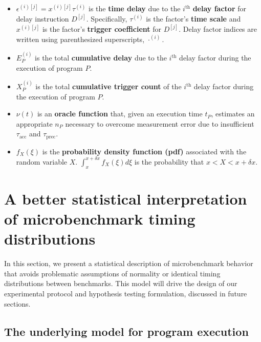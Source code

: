 \documentclass[conference]{IEEEtran}
\begin{document}
\begin{itemize}
    \item
    $\epsilon^{(i)[j]} = x^{(i)[j]} \tau^{(i)}$ is the \textbf{time delay} due to the
    $i^{\textrm{th}}$ \textbf{delay factor} for delay instruction $D^{[j]}$.  Specifically,
    $\tau^{(i)}$ is the factor's \textbf{time scale} and $x^{(i)[j]}$ is the factor's
    \textbf{trigger coefficient} for $D^{[j]}$. Delay factor indices are written using
    parenthesized superscripts, $\cdot^{(i)}$.

    \item
    $E_P^{(i)}$ is the total \textbf{cumulative delay} due to the $i^{\textrm{th}}$ delay
    factor during the execution of program $P$.

    \item
    $X^{(i)}_P$ is the total \textbf{cumulative trigger count} of the $i^{\textrm{th}}$
    delay factor during the execution of program $P$.

    \item
    $\nu(t)$ is an \textbf{oracle function} that, given an execution time $t_P$, estimates
    an appropriate $n_P$ necessary to overcome measurement error due to insufficient
    $\tau_{\textrm{acc}}$ and $\tau_{\textrm{prec}}$.

    \item
    $f_X(\xi)$ is the \textbf{probability density function (pdf)} associated with the random
    variable $X$. $\int_{x}^{x+\delta x} f_X(\xi) d\xi$ is the probability that $x < X <
    x+\delta x$.
\end{itemize}

\label{sec:model}
\section{A better statistical interpretation of microbenchmark timing distributions}

In this section, we present a statistical description of microbenchmark behavior that avoids
problematic assumptions of normality or identical timing distributions between benchmarks.
This model will drive the design of our experimental protocol and hypothesis testing
formulation, discussed in future sections.

\subsection{The underlying model for program execution}
\end{document}
